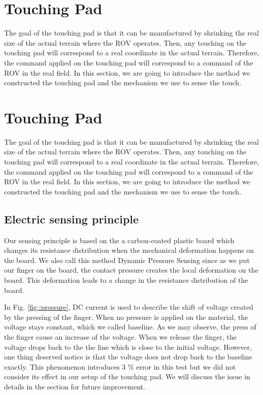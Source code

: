 \documentclass[reprint,amsmath, amsfonts, amssymb, aps, letterpaper]{revtex4-1}
\begin{document}
\section{Touching Pad}
The goal of the touching pad is that it can be manufactured by shrinking the real size of the actual terrain where the ROV operates. Then, any touching on the touching pad will correspond to a real coordinate in the actual terrain. Therefore, the command applied on the touching pad will correspond to a command of the ROV in the real field. In this section, we are going to introduce the method we constructed the touching pad and the mechanism we use to sense the touch.


\section{Touching Pad}
The goal of the touching pad is that it can be manufactured by shrinking the real size of the actual terrain where the ROV operates. Then, any touching on the touching pad will correspond to a real coordinate in the actual terrain. Therefore, the command applied on the touching pad will correspond to a command of the ROV in the real field. In this section, we are going to introduce the method we constructed the touching pad and the mechanism we use to sense the touch.

\subsection{Electric sensing principle}
Our sensing principle is based on the a carbon-coated plastic board which changes its resistance distribution when the mechanical deformation happens on the board. We also call this method Dynamic Pressure Sensing since as we put our finger on the board, the contact pressure creates the local deformation on the board. This deformation leads to a change in the resistance distribution of the board. 

In Fig. \ref{fig::pressure}, DC current is used to describe the shift of voltage created by the pressing of the finger. When no pressure is applied on the material, the voltage stays constant, which we called baseline. As we may observe, the press of the finger cause an increase of the voltage. When we release the finger, the voltage drops back to the the line which is close to the initial voltage. However, one thing deserved notice is that the voltage does not drop back to the baseline exactly. This phenomenon introduces 3 \% error in this test but we did not consider its effect in our setup of the touching pad. We will discuss the issue in details in the section for future improvement.
\end{document}
